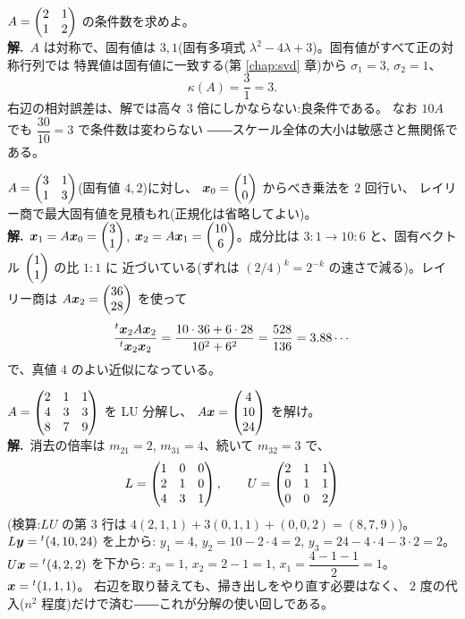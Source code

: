 \begin{rei}[例題・基本(条件数の計算)]\label{rei:num-basic2}
$A = \begin{pmatrix}2 & 1 \\ 1 & 2\end{pmatrix}$ の条件数を求めよ。\\
\textbf{解.}\ $A$ は対称で、固有値は $3, 1$(固有多項式
$\lambda^2 - 4\lambda + 3$)。固有値がすべて正の対称行列では
特異値は固有値に一致する(第 \ref{chap:svd} 章)から
$\sigma_1 = 3$, $\sigma_2 = 1$、
\[
\kappa(A) = \frac{3}{1} = 3.
\]
右辺の相対誤差は、解では高々 $3$ 倍にしかならない:良条件である。
なお $10A$ でも $\dfrac{30}{10} = 3$ で条件数は変わらない
――スケール全体の大小は敏感さと無関係である。
\end{rei}

\begin{rei}[例題・基本(べき乗法とレイリー商)]\label{rei:num-basic3}
$A = \begin{pmatrix}3 & 1 \\ 1 & 3\end{pmatrix}$(固有値 $4, 2$)に対し、
$\bm{x}_0 = \begin{pmatrix}1 \\ 0\end{pmatrix}$ からべき乗法を $2$ 回行い、
レイリー商で最大固有値を見積もれ(正規化は省略してよい)。\\
\textbf{解.}\ $\bm{x}_1 = A\bm{x}_0 = \begin{pmatrix}3 \\ 1\end{pmatrix}$,
$\bm{x}_2 = A\bm{x}_1 = \begin{pmatrix}10 \\ 6\end{pmatrix}$。成分比は
$3 : 1 \to 10 : 6$ と、固有ベクトル $\begin{pmatrix}1 \\ 1\end{pmatrix}$ の比 $1 : 1$ に
近づいている(ずれは $(2/4)^k = 2^{-k}$ の速さで減る)。レイリー商は
$A\bm{x}_2 = \begin{pmatrix}36 \\ 28\end{pmatrix}$ を使って
\[
\frac{{}^t\bm{x}_2 A\bm{x}_2}{{}^t\bm{x}_2\bm{x}_2}
= \frac{10 \cdot 36 + 6 \cdot 28}{10^2 + 6^2}
= \frac{528}{136} = 3.88\cdots
\]
で、真値 $4$ のよい近似になっている。
\end{rei}

\begin{rei}[例題・標準($3$ 次の LU 分解と使い回し)]\label{rei:num-std1}
$A = \begin{pmatrix}2 & 1 & 1 \\ 4 & 3 & 3 \\ 8 & 7 & 9\end{pmatrix}$ を LU 分解し、
$A\bm{x} = \begin{pmatrix}4 \\ 10 \\ 24\end{pmatrix}$ を解け。\\
\textbf{解.}\ 消去の倍率は $m_{21} = 2$, $m_{31} = 4$、続いて
$m_{32} = 3$ で、
\[
L = \begin{pmatrix}1 & 0 & 0 \\ 2 & 1 & 0 \\ 4 & 3 & 1\end{pmatrix}, \qquad
U = \begin{pmatrix}2 & 1 & 1 \\ 0 & 1 & 1 \\ 0 & 0 & 2\end{pmatrix}
\]
(検算:$LU$ の第 $3$ 行は
$4(2, 1, 1) + 3(0, 1, 1) + (0, 0, 2) = (8, 7, 9)$)。
$L\bm{y} = {}^t(4, 10, 24)$ を上から:
$y_1 = 4$, $y_2 = 10 - 2 \cdot 4 = 2$,
$y_3 = 24 - 4 \cdot 4 - 3 \cdot 2 = 2$。
$U\bm{x} = {}^t(4, 2, 2)$ を下から:
$x_3 = 1$, $x_2 = 2 - 1 = 1$, $x_1 = \dfrac{4 - 1 - 1}{2} = 1$。
$\bm{x} = {}^t(1, 1, 1)$。
右辺を取り替えても、掃き出しをやり直す必要はなく、
$2$ 度の代入($n^2$ 程度)だけで済む――これが分解の使い回しである。
\end{rei}

